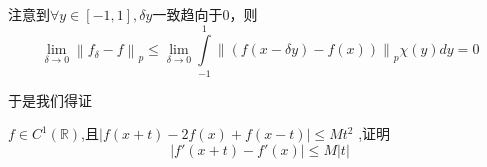 \documentclass[lang=cn,10pt]{elegantbook}
\begin{document}
\begin{solution}
		注意到$\forall y\in[-1,1],\delta y$一致趋向于0，则
		\begin{equation*}
			\lim_{\delta \rightarrow 0} \left\| f_{\delta}-f \right\| _p\le \lim_{\delta \rightarrow 0} \int\limits_{-1}^1{\left\| \left( f\left( x-\delta y \right) -f\left( x \right) \right) \right\| _p\chi \left( y \right) dy}=0
		\end{equation*}
		
		于是我们得证
	\end{solution}
	
	\begin{example}
		$f\in C^{1}(\mathbb{R})$,且$|f\left( x+t \right) -2f\left( x \right) +f\left( x-t \right) |\le Mt^2$
		,证明
		\begin{equation*}
			|f'(x+t)-f'(x)|\le M|t|
		\end{equation*}
	\end{example}
\end{document}
